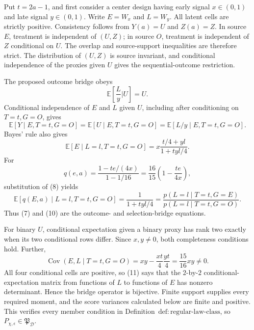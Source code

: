 Put \(t=2a-1\), and first consider a center design having early signal \(x\in(0,1)\) and late signal \(y\in(0,1)\). Write \(E=W_x\) and \(L=W_y\). All latent cells are strictly positive. Consistency follows from \(Y(a)=U\) and \(Z(a)=Z\). In source \(E\), treatment is independent of \((U,Z)\); in source \(O\), treatment is independent of \(Z\) conditional on \(U\). The overlap and source-support inequalities are therefore strict. The distribution of \((U,Z)\) is source invariant, and conditional independence of the proxies given \(U\) gives the sequential-outcome restriction.

The proposed outcome bridge obeys
\[
 \mathbb E\!\left[\frac{L}{y}\mathrel{\Big|}U\right]=U.
\]
Conditional independence of \(E\) and \(L\) given \(U\), including after conditioning on \(T=t,G=O\), gives
\[
 \mathbb E[Y\mid E,T=t,G=O]
 =\mathbb E[U\mid E,T=t,G=O]
 =\mathbb E[L/y\mid E,T=t,G=O].                         \tag{7}
\]
Bayes' rule also gives
\[
 \mathbb E[E\mid L=l,T=t,G=O]
 =x\frac{t/4+yl}{1+tyl/4}.                              \tag{8}
\]
For
\[
 q(e,a)=\frac{1-te/(4x)}{1-1/16}
 =\frac{16}{15}\left(1-\frac{te}{4x}\right),           \tag{9}
\]
substitution of (8) yields
\[
 \mathbb E[q(E,a)\mid L=l,T=t,G=O]
 =\frac1{1+tyl/4}
 =\frac{p(L=l\mid T=t,G=E)}{p(L=l\mid T=t,G=O)}.        \tag{10}
\]
Thus (7) and (10) are the outcome- and selection-bridge equations.

For binary \(U\), conditional expectation given a binary proxy has rank two exactly when its two conditional rows differ. Since \(x,y\ne0\), both completeness conditions hold. Further,
\[
 \operatorname{Cov}(E,L\mid T=t,G=O)
 =xy-\frac{xt}{4}\frac{yt}{4}=\frac{15}{16}xy\ne0.     \tag{11}
\]
All four conditional cells are positive, so (11) says that the \(2\)-by-\(2\) conditional-expectation matrix from functions of \(L\) to functions of \(E\) has nonzero determinant. Hence the bridge operator is bijective. Finite support supplies every required moment, and the score variances calculated below are finite and positive. This verifies every member condition in Definition~\(\mathrm{def{:}regular\text{-}law\text{-}class}\), so \(P_{\chi,\epsilon}\in\mathfrak P_{\mathcal D}\).

